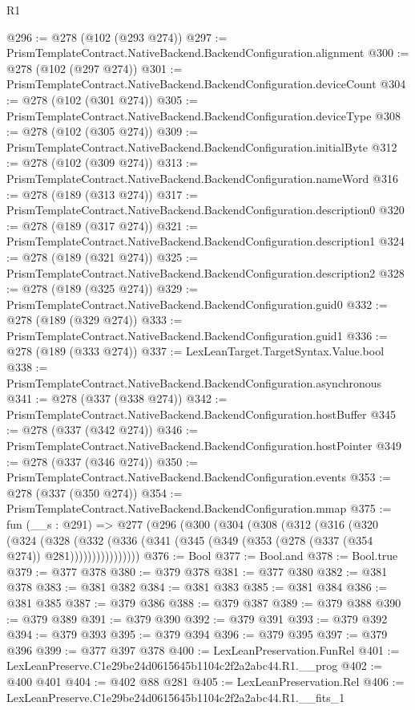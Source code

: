 \begin{lexlean}{R1}
\begin{coremodule}
@296 := @278 (@102 (@293 @274))
@297 := PrismTemplateContract.NativeBackend.BackendConfiguration.alignment
@300 := @278 (@102 (@297 @274))
@301 := PrismTemplateContract.NativeBackend.BackendConfiguration.deviceCount
@304 := @278 (@102 (@301 @274))
@305 := PrismTemplateContract.NativeBackend.BackendConfiguration.deviceType
@308 := @278 (@102 (@305 @274))
@309 := PrismTemplateContract.NativeBackend.BackendConfiguration.initialByte
@312 := @278 (@102 (@309 @274))
@313 := PrismTemplateContract.NativeBackend.BackendConfiguration.nameWord
@316 := @278 (@189 (@313 @274))
@317 := PrismTemplateContract.NativeBackend.BackendConfiguration.description0
@320 := @278 (@189 (@317 @274))
@321 := PrismTemplateContract.NativeBackend.BackendConfiguration.description1
@324 := @278 (@189 (@321 @274))
@325 := PrismTemplateContract.NativeBackend.BackendConfiguration.description2
@328 := @278 (@189 (@325 @274))
@329 := PrismTemplateContract.NativeBackend.BackendConfiguration.guid0
@332 := @278 (@189 (@329 @274))
@333 := PrismTemplateContract.NativeBackend.BackendConfiguration.guid1
@336 := @278 (@189 (@333 @274))
@337 := LexLeanTarget.TargetSyntax.Value.bool
@338 := PrismTemplateContract.NativeBackend.BackendConfiguration.asynchronous
@341 := @278 (@337 (@338 @274))
@342 := PrismTemplateContract.NativeBackend.BackendConfiguration.hostBuffer
@345 := @278 (@337 (@342 @274))
@346 := PrismTemplateContract.NativeBackend.BackendConfiguration.hostPointer
@349 := @278 (@337 (@346 @274))
@350 := PrismTemplateContract.NativeBackend.BackendConfiguration.events
@353 := @278 (@337 (@350 @274))
@354 := PrismTemplateContract.NativeBackend.BackendConfiguration.mmap
@375 := fun (__s : @291) =>
  @277
    (@296
      (@300
        (@304
          (@308
            (@312
              (@316
                (@320
                  (@324
                    (@328
                      (@332
                        (@336 (@341 (@345 (@349 (@353 (@278 (@337 (@354 @274)) @281))))))))))))))))
@376 := Bool
@377 := Bool.and
@378 := Bool.true
@379 := @377 @378
@380 := @379 @378
@381 := @377 @380
@382 := @381 @378
@383 := @381 @382
@384 := @381 @383
@385 := @381 @384
@386 := @381 @385
@387 := @379 @386
@388 := @379 @387
@389 := @379 @388
@390 := @379 @389
@391 := @379 @390
@392 := @379 @391
@393 := @379 @392
@394 := @379 @393
@395 := @379 @394
@396 := @379 @395
@397 := @379 @396
@399 := @377 @397 @378
@400 := LexLeanPreservation.FunRel
@401 := LexLeanPreserve.C1e29be24d0615645b1104c2f2a2abc44.R1.__prog
@402 := @400 @401
@404 := @402 @88 @281
@405 := LexLeanPreservation.Rel
@406 := LexLeanPreserve.C1e29be24d0615645b1104c2f2a2abc44.R1.__fits_1

\end{coremodule}
\end{lexlean}
